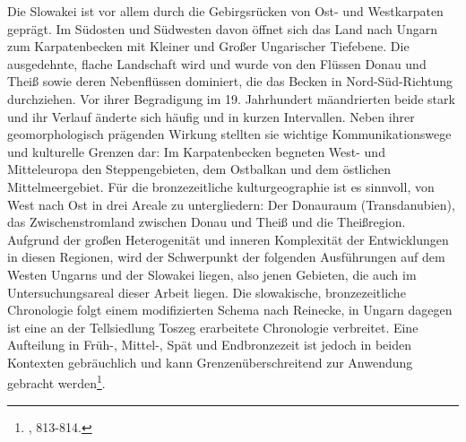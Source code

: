 \documentclass[openany,twoside,twocolumn]{book}
\let\rmarkdownfootnote\footnote%
\def\footnote{\protect\rmarkdownfootnote}
\begin{document}
Die Slowakei ist vor allem durch die Gebirgsrücken von Ost- und
Westkarpaten geprägt. Im Südosten und Südwesten davon öffnet sich das
Land nach Ungarn zum Karpatenbecken mit Kleiner und Großer Ungarischer
Tiefebene. Die ausgedehnte, flache Landschaft wird und wurde von den
Flüssen Donau und Theiß sowie deren Nebenflüssen dominiert, die das
Becken in Nord-Süd-Richtung durchziehen. Vor ihrer Begradigung im 19.
Jahrhundert mäandrierten beide stark und ihr Verlauf änderte sich häufig
und in kurzen Intervallen. Neben ihrer geomorphologisch prägenden
Wirkung stellten sie wichtige Kommunikationswege und kulturelle Grenzen
dar: Im Karpatenbecken begneten West- und Mitteleuropa den
Steppengebieten, dem Ostbalkan und dem östlichen Mittelmeergebiet. Für
die bronzezeitliche kulturgeographie ist es sinnvoll, von West nach Ost
in drei Areale zu untergliedern: Der Donauraum (Transdanubien), das
Zwischenstromland zwischen Donau und Theiß und die Theißregion. Aufgrund
der großen Heterogenität und inneren Komplexität der Entwicklungen in
diesen Regionen, wird der Schwerpunkt der folgenden Ausführungen auf dem
Westen Ungarns und der Slowakei liegen, also jenen Gebieten, die auch im
Untersuchungsareal dieser Arbeit liegen. Die slowakische,
bronzezeitliche Chronologie folgt einem modifizierten Schema nach
Reinecke, in Ungarn dagegen ist eine an der Tellsiedlung Toszeg
erarbeitete Chronologie verbreitet. Eine Aufteilung in Früh-, Mittel-,
Spät und Endbronzezeit ist jedoch in beiden Kontexten gebräuchlich und
kann Grenzenüberschreitend zur Anwendung gebracht werden\footnote{\textcite{markova_slovakia_2013},
  813-814.}.
\end{document}
